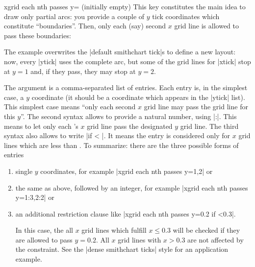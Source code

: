 \begin{pgfplotskey}{xgrid each nth passes y= (initially empty)}
    This key constitutes the main idea to draw only partial arcs: you provide a
    couple of $y$ tick coordinates which constitute ``boundaries''. Then, only
    each (say) second $x$ grid line is allowed to pass these boundaries:
\begin{codeexample}[]
\begin{tikzpicture}
\begin{smithchart}[
    xtick={0.2,0.5,1,2,5},
    ytick={
        0,
         0.2, 0.5, 1, 2, 5,
        -0.2,-0.5,-1,-2,-5
    },
    xgrid each nth passes y={1,2},
]
\end{smithchart}
\end{tikzpicture}
\end{codeexample}
    The example overwrites the |default smithchart tick|s to define a new
    layout: now, every |ytick| uses the complete arc, but some of the grid
    lines for |xtick| stop at $y=1$ and, if they pass, they may stop at $y=2$.

    The argument  is a comma-separated list of
    entries. Each entry is, in the simplest case, a $y$ coordinate (it should
    be a coordinate which appears in the |ytick| list). This simplest case
    means ``only each second $x$ grid line may pass the grid line for this
    $y$''. The second syntax allows to provide a natural number, using |:|. This means to let only each 's $x$
    grid line pass the designated $y$ grid line. The third syntax also allows
    to write |if < |. It means the entry is considered only for
    $x$ grid lines which are less than . To summarize: there are
    the three possible forms of entries
    \begin{enumerate}
        \item single $y$ coordinates, for example
            |xgrid each nth passes y={1,2}| or
        \item the same as above, followed by an integer, for example
            |xgrid each nth passes y={1:3,2:2}| or
        \item an additional restriction clause like
            |xgrid each nth passes y={0.2 if <0.3}|.

            In this case, the all $x$ grid lines which fulfill $x \le 0.3$ will
            be checked if they are allowed to pass $y=0.2$. All $x$ grid lines
            with $x > 0.3$ are not affected by the constraint. See the
            |dense smithchart ticks| style for an application example.
    \end{enumerate}


\end{pgfplotskey}
